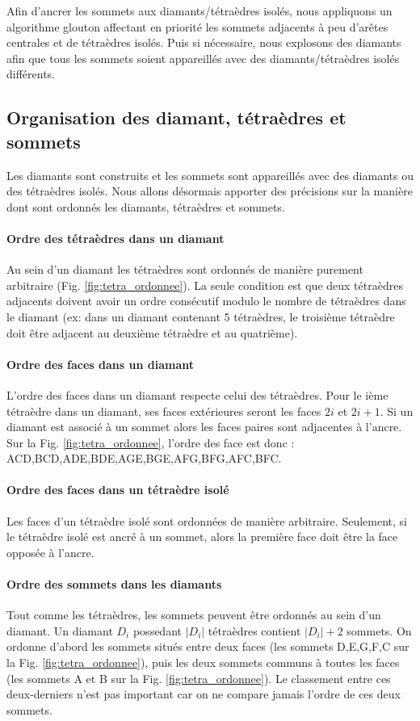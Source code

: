 \noindent
Afin d'ancrer les sommets aux diamants/tétraèdres isolés, nous appliquons un algorithme glouton affectant en priorité les sommets adjacents à peu d'arêtes centrales et de tétraèdres isolés. Puis si nécessaire, nous explosons des diamants afin que tous les sommets soient appareillés avec des diamants/tétraèdres isolés différents.

\subsection{Organisation des diamant, tétraèdres et sommets}
\noindent
Les diamants sont construits et les sommets sont appareillés avec des diamants ou des tétraèdres isolés. Nous allons désormais apporter des précisions sur la manière dont sont ordonnés les diamants, tétraèdres et sommets.
\paragraph{Ordre des tétraèdres dans un diamant}
Au sein d'un diamant les tétraèdres sont ordonnés de manière purement arbitraire (Fig. \ref{fig:tetra_ordonnee}). La seule condition est que deux tétraèdres adjacents doivent avoir un ordre consécutif modulo le nombre de tétraèdres dans le diamant (ex: dans un diamant contenant 5 tétraèdres, le troisième tétraèdre doit être adjacent au deuxième tétraèdre et au quatrième).
\paragraph{Ordre des faces dans un diamant}
L'ordre des faces dans un diamant respecte celui des tétraèdres. Pour le ième tétraèdre dans un diamant, ses faces extérieures seront les faces $2i$ et $2i+1$. Si un diamant est associé à un sommet alors les faces paires sont adjacentes à l'ancre. Sur la Fig. \ref{fig:tetra_ordonnee}, l'ordre des face est donc : ACD,BCD,ADE,BDE,AGE,BGE,AFG,BFG,AFC,BFC.
\paragraph{Ordre des faces dans un tétraèdre isolé}
Les faces d'un tétraèdre isolé sont ordonnées de manière arbitraire. Seulement, si le tétraèdre isolé est ancré à un sommet, alors la première face doit être la face opposée à l'ancre.
\paragraph{Ordre des sommets dans les diamants}
\label{Ordre des sommets dans les diamants}Tout comme les tétraèdres, les sommets peuvent être ordonnés au sein d'un diamant. Un diamant $D_i$ possedant $|D_i|$ tétraèdres contient $|D_i|+2$ sommets. On ordonne d'abord les sommets situés entre deux faces (les sommets D,E,G,F,C sur la Fig. \ref{fig:tetra_ordonnee}), puis les deux sommets communs à toutes les faces (les sommets A et B sur la Fig. \ref{fig:tetra_ordonnee}). Le classement entre ces deux-derniers n'est pas important car on ne compare jamais l'ordre de ces deux sommets.\\
